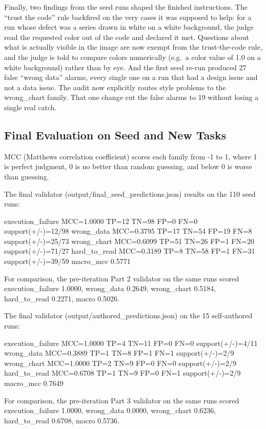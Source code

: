 \documentclass[11pt]{article}
\begin{document}
Finally, two findings from the seed runs shaped the finished instructions. The ``trust the code'' rule backfired on the very cases it was supposed to help: for a run whose defect was a series drawn in white on a white background, the judge read the requested color out of the code and declared it met. Questions about what is actually visible in the image are now exempt from the trust-the-code rule, and the judge is told to compare colors numerically (e.g.\ a color value of 1.0 on a white background) rather than by eye. And the first seed re-run produced 27 false ``wrong data'' alarms, every single one on a run that had a design issue and not a data issue. The audit now explicitly routes style problems to the wrong\_chart family. That one change cut the false alarms to 19 without losing a single real catch.

\subsection{Final Evaluation on Seed and New Tasks}

MCC (Matthews correlation coefficient) scores each family from -1 to 1, where 1 is perfect judgment, 0 is no better than random guessing, and below 0 is worse than guessing.

The final validator (output/final\_seed\_predictions.json) results on the 110 seed runs:

    execution_failure    MCC=1.0000  TP=12 TN=98 FP=0 FN=0  support(+/-)=12/98
    wrong_data           MCC=0.3795  TP=17 TN=54 FP=19 FN=8  support(+/-)=25/73
    wrong_chart          MCC=0.6099  TP=51 TN=26 FP=1 FN=20  support(+/-)=71/27
    hard_to_read         MCC=0.3189  TP=8 TN=58 FP=1 FN=31  support(+/-)=39/59
    macro_mcc            0.5771

For comparison, the pre-iteration Part 2 validator on the same runs scored execution\_failure 1.0000, wrong\_data 0.2649, wrong\_chart 0.5184, hard\_to\_read 0.2271, macro 0.5026.

The final validator (output/authored\_predictions.json) on the 15 self-authored runs:

    execution_failure    MCC=1.0000  TP=4 TN=11 FP=0 FN=0  support(+/-)=4/11
    wrong_data           MCC=0.3889  TP=1 TN=8 FP=1 FN=1  support(+/-)=2/9
    wrong_chart          MCC=1.0000  TP=2 TN=9 FP=0 FN=0  support(+/-)=2/9
    hard_to_read         MCC=0.6708  TP=1 TN=9 FP=0 FN=1  support(+/-)=2/9
    macro_mcc            0.7649

For comparison, the pre-iteration Part 3 validator on the same runs scored execution\_failure 1.0000, wrong\_data 0.0000, wrong\_chart 0.6236, hard\_to\_read 0.6708, macro 0.5736.
\end{document}
